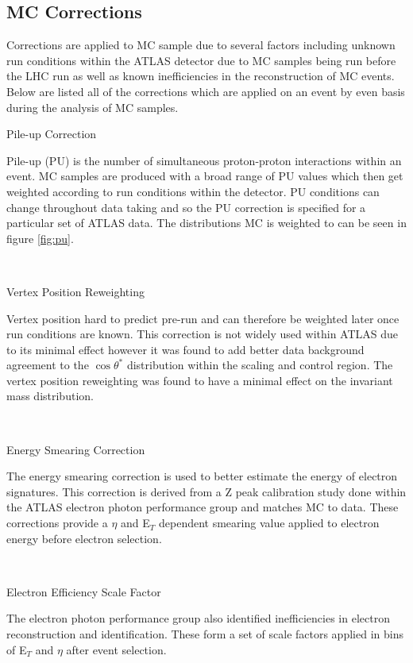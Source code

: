 \subsection{MC Corrections}
   \label{sec:correc}

   Corrections are applied to MC sample due to several factors including unknown run conditions within the ATLAS detector due to MC samples being run before the LHC run as well as known inefficiencies in the reconstruction of MC events. Below are listed all of the corrections which are applied on an event by even basis during the analysis of MC samples.\\


   {\bf\raggedright Pile-up Correction}

   {\raggedright Pile-up (PU) is the number of simultaneous proton-proton interactions within an event. MC samples are produced with a broad range of PU values which then get weighted according to run conditions within the detector. PU conditions can change throughout data taking and so the PU correction is specified for a particular set of ATLAS data. The distributions MC is weighted to can be seen in figure \ref{fig:pu}.}\\

   {\bf\raggedright Vertex Position Reweighting}

   {\raggedright Vertex position hard to predict pre-run and can therefore be weighted later once run conditions are known. This correction is not widely used within ATLAS due to its minimal effect however it was found to add better data background agreement to the $\cos{\theta^{*}}$ distribution within the scaling and control region. The vertex position reweighting was found to have a minimal effect on the invariant mass distribution.}\\

   {\bf\raggedright Energy Smearing Correction}

   {\raggedright The energy smearing correction is used to better estimate the energy of electron signatures. This correction is derived from a Z peak calibration study \cite{ATLAS-CONF-2014-032} done within the ATLAS electron photon performance group and matches MC to data. These corrections provide a $\eta$ and E$_{T}$ dependent smearing value applied to electron energy before electron selection.}\\

   {\bf\raggedright Electron Efficiency Scale Factor}

   {\raggedright The electron photon performance group also identified inefficiencies in electron reconstruction and identification. These form a set of scale factors applied in bins of E$_{T}$ and $\eta$ after event selection.}\\


